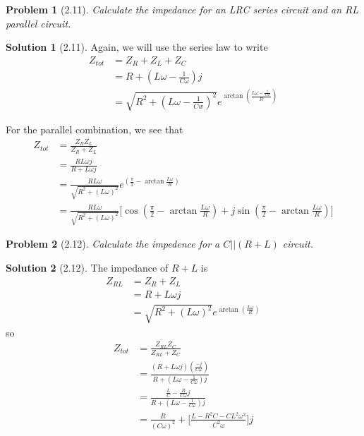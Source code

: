 \documentclass[12pt]{article}
\newtheorem*{problem}{Problem}
\theoremstyle{definition}
\newtheorem*{solution}{Solution}
\begin{document}
\begin{problem}[2.11]
Calculate the impedance for an LRC series circuit and an RL parallel circuit.
\end{problem}

\begin{solution}[2.11]

Again, we will use the series law to write
\[
\begin{aligned}
Z_{tot} & = Z_R + Z_L + Z_C\\
	& = R + (L\omega - \frac{1}{C\omega})j\\
	& = \sqrt{R^2+(L\omega - \frac{1}{Cw})^2}e^{\arctan(\frac{L\omega - \frac{1}{Cw}}{R})}
\end{aligned}
\]

For the parallel combination, we see that
\[
\begin{aligned}
Z_{tot} & = \frac{Z_RZ_L}{Z_R+Z_L}\\
        & = \frac{RL\omega j}{R + L\omega j}\\
	& = \tfrac{RL\omega}{\sqrt{R^2 + (L\omega)^2}}e^{(\frac{\pi}{2} - \arctan{\frac{L\omega}{R}})}\\
	& = \tfrac{RL\omega}{\sqrt{R^2 + (L\omega)^2}}\Big[\cos(\frac{\pi}{2} - \arctan{\frac{L\omega}{R}}) + j\sin(\frac{\pi}{2} - \arctan{\frac{L\omega}{R}})\Big]
\end{aligned}
\]

\end{solution}

\begin{problem}[2.12]
Calculate the impedence for a $C||(R+L)$ circuit.
\end{problem}

\begin{solution}[2.12]
The impedance of $R+L$ is 
\[
\begin{aligned}
Z_{RL} 	& = Z_R + Z_L\\
	& = R + L\omega j\\
	& = \sqrt{R^2 + (L\omega)^2}e^{\arctan(\frac{L\omega}{R})}
\end{aligned}
\]
so 
\[
\begin{aligned}
Z_{tot} & = \frac{Z_{RL}Z_C}{Z_{RL} + Z_C}\\
	& = \frac{(R+L\omega j)(\frac{-j}{C\omega})}{R + (L\omega - \frac{1}{C\omega})j}\\
	& = \frac{\frac{L}{C} - \frac{R}{C\omega}j}{R + (L\omega - \frac{1}{C\omega})j}\\
	& = \frac{R}{(C\omega)^2} + \Big[\frac{L-R^2C-CL^2\omega^2}{C^2\omega}\Big]j
\end{aligned}
\]
\end{solution}
\end{document}
